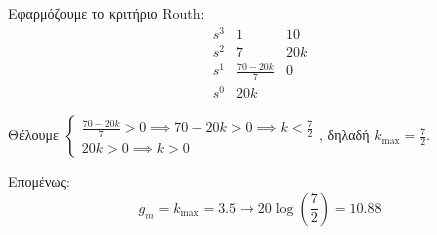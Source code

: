 \documentclass[11pt,a4paper,notitlepage,fleqn]{article}
\begin{document}
\begin{exercise}
\begin{enumgreekparen}
	Εφαρμόζουμε το κριτήριο Routh:
	\[
	\begin{array}{r|cc}
	s^3&1&10 \\
	s^2&7&20k \\
	s^1 & \frac{70-20k}{7} & 0\\
	s^0 & 20k
	\end{array}
	\]
	
	Θέλουμε \(
		\begin{cases}
		\frac{70-20k}{7}> 0 \implies 70-20k > 0 \implies k<\frac{7}{2}\\
		20k > 0 \implies k>0
		\end{cases}
	\), δηλαδή \( k_{\max} = \frac{7}{2} \).
	
	Επομένως:
	\[
	g_m = k_{\max} = 3.5 \to 20\log\left( \frac{7}{2} \right) = 10.88
	\]
\end{enumgreekparen}

\end{exercise}
\end{document}
